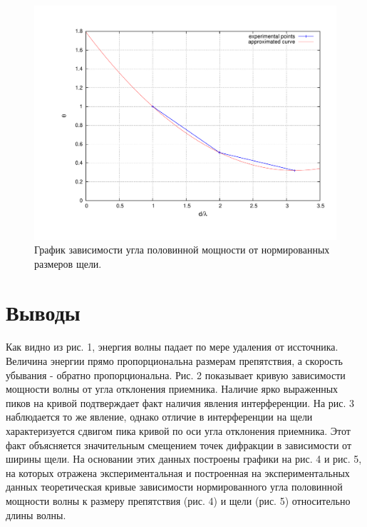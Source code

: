 \documentclass[12pt,a4paper,oneside, reqno]{amsart}
\begin{document}
\begin{figure}
    \centering
    \includegraphics[width = \textwidth]{plot4-2.pdf}
    \vspace{-30pt}
    \caption{График зависимости угла половинной мощности от нормированных размеров щели.}
    \label{fig:plot5}
\end{figure}

\newpage
\section{Выводы}
Как видно из рис. 1, энергия волны падает по мере удаления от иссточника. Величина энергии прямо пропорциональна размерам препятствия, а скорость убывания - обратно пропорциональна. Рис. 2 показывает кривую зависимости мощности волны от угла отклонения приемника. Наличие ярко выраженных пиков на кривой подтверждает факт наличия явления интерференции. На рис. 3 наблюдается то же явление, однако отличие в интерференции на щели характеризуется сдвигом пика кривой по оси угла отклонения приемника. Этот факт объясняется значительным смещением точек дифракции в зависимости от ширины щели. На основании этих данных построены графики на рис. 4 и рис. 5, на которых отражена экспериментальная и построенная на экспериментальных данных теоретическая кривые зависимости нормированного угла половинной мощности волны к размеру препятствия (рис. 4) и щели (рис. 5) относительно длины волны. 
\end{document}
